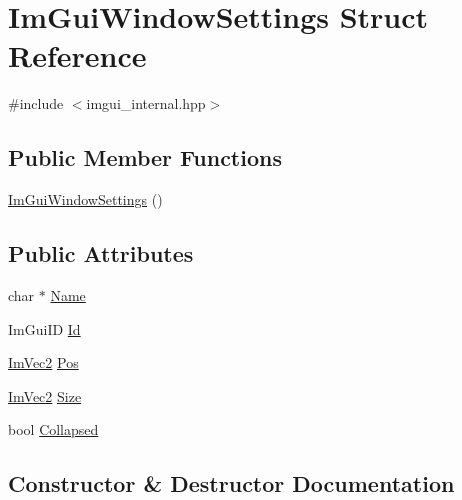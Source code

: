 \hypertarget{struct_im_gui_window_settings}{}\section{Im\+Gui\+Window\+Settings Struct Reference}
\label{struct_im_gui_window_settings}


{\ttfamily \#include $<$imgui\+\_\+internal.\+hpp$>$}

\subsection*{Public Member Functions}
\begin{DoxyCompactItemize}
\item 
\hyperlink{struct_im_gui_window_settings_a694e496dba59b5aaabe14cce66309acd}{Im\+Gui\+Window\+Settings} ()
\end{DoxyCompactItemize}
\subsection*{Public Attributes}
\begin{DoxyCompactItemize}
\item 
char $\ast$ \hyperlink{struct_im_gui_window_settings_a840259e14a45a600f84fcb940554e2d5}{Name}
\item 
Im\+Gui\+ID \hyperlink{struct_im_gui_window_settings_a82d2bf00ccbd8ac796c20bb1daa9ab9a}{Id}
\item 
\hyperlink{struct_im_vec2}{Im\+Vec2} \hyperlink{struct_im_gui_window_settings_a439e19e13a89681bc512f3282a253ebe}{Pos}
\item 
\hyperlink{struct_im_vec2}{Im\+Vec2} \hyperlink{struct_im_gui_window_settings_a9114134a6992827fbfc78bf4088e5f7f}{Size}
\item 
bool \hyperlink{struct_im_gui_window_settings_a79308182bdab97cb87b3d6284f22c1d2}{Collapsed}
\end{DoxyCompactItemize}


\subsection{Constructor \& Destructor Documentation}
\hypertarget{struct_im_gui_window_settings_a694e496dba59b5aaabe14cce66309acd}{}\label{struct_im_gui_window_settings_a694e496dba59b5aaabe14cce66309acd} 
